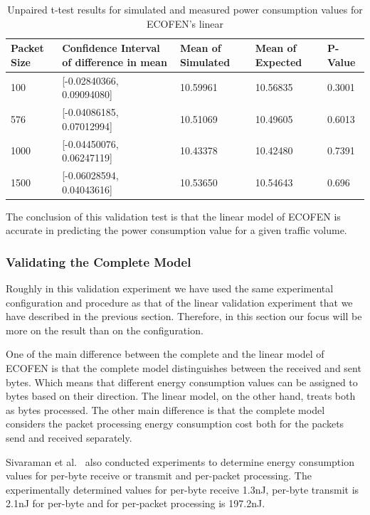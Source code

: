 \begin{table}
	\begin{tabular}{|p{1.3cm}|p{4.6cm}|p{2.1cm}|p{2.1cm}|p{1.3cm}|} 
	    \hline 
		\textbf{Packet Size} & \textbf{Confidence Interval of difference in mean} & \textbf{Mean of Simulated} & \textbf{Mean of Expected}& \textbf{P-Value}\\ 
		\hline 
		 100 &	[-0.02840366, 0.09094080]&	10.59961&	10.56835&	0.3001\\
		\hline
		 576 &	[-0.04086185, 0.07012994]&	10.51069&	10.49605&	0.6013\\ 
		\hline
		 1000&	[-0.04450076, 0.06247119]&	10.43378&	10.42480&	0.7391\\ 
	    \hline	 
	     1500&	[-0.06028594, 0.04043616]&	10.53650&	10.54643&	0.696\\ 
	    \hline
	\end{tabular} 
	\caption{Unpaired t-test results for simulated and measured power consumption values for ECOFEN's linear}
	\label{table:linearttest}
\end{table}

The conclusion of this validation test is that the linear model of ECOFEN is accurate in predicting the power consumption value for a given traffic volume. 
\subsubsection{Validating the Complete Model}
Roughly in this validation experiment we have used the same experimental configuration and procedure as that of the linear validation experiment that we have described in the previous section. Therefore, in this section our focus will be more on the result than on the configuration.

One of the main difference between the complete and the linear model of ECOFEN is that the complete model distinguishes between the received and sent bytes. Which means that different energy consumption values can be assigned to bytes based on their direction. The linear model, on the other hand, treats both as bytes processed. The other main difference is that the complete model considers the packet processing energy consumption cost both for the packets send and received separately. 

Sivaraman et al.{\ }\cite{Sivaraman} also conducted experiments to determine energy consumption values for per-byte receive or transmit and per-packet processing. The experimentally determined values for per-byte receive 1.3nJ, per-byte transmit is 2.1nJ for per-byte and for per-packet processing is 197.2nJ. 

